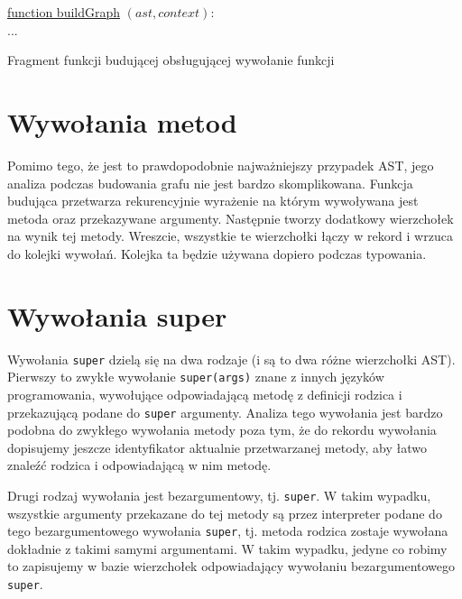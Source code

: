 \documentclass[declaration,shortabstract,mgr]{iithesis}
\newcommand{\algsize}{\small}
\begin{document}
\begin{algorithm}
    \algsize
    \underline{function buildGraph} $(ast, context)$:\\
    ...\\
    \caption{Fragment funkcji budującej obsługującej wywołanie funkcji}
    \label{alg:buildGraph-handleSend}
\end{algorithm}


\section{Wywołania metod}

Pomimo tego, że jest to prawdopodobnie najważniejszy przypadek AST, jego analiza podczas budowania grafu nie jest bardzo skomplikowana. Funkcja budująca przetwarza rekurencyjnie wyrażenie na którym wywoływana jest metoda oraz przekazywane argumenty. Następnie tworzy dodatkowy wierzchołek na wynik tej metody. Wreszcie, wszystkie te wierzchołki łączy w rekord i wrzuca do kolejki wywołań. Kolejka ta będzie używana dopiero podczas typowania.

\section{Wywołania super}

Wywołania \texttt{super} dzielą się na dwa rodzaje (i są to dwa różne wierzchołki AST). Pierwszy to zwykłe wywołanie \texttt{super(args)} znane z innych języków programowania, wywołujące odpowiadającą metodę z definicji rodzica i przekazującą podane do \texttt{super} argumenty. Analiza tego wywołania jest bardzo podobna do zwykłego wywołania metody poza tym, że do rekordu wywołania dopisujemy jeszcze identyfikator aktualnie przetwarzanej metody, aby łatwo znaleźć rodzica i odpowiadającą w nim metodę.

Drugi rodzaj wywołania jest bezargumentowy, tj. \texttt{super}. W takim wypadku, wszystkie argumenty przekazane do tej metody są przez interpreter podane do tego bezargumentowego wywołania \texttt{super}, tj. metoda rodzica zostaje wywołana dokładnie z takimi samymi argumentami. W takim wypadku, jedyne co robimy to zapisujemy w bazie wierzchołek odpowiadający wywołaniu bezargumentowego \texttt{super}.
\end{document}
